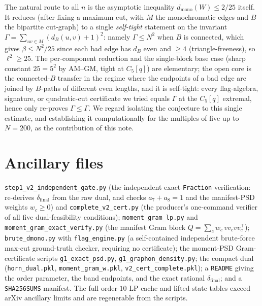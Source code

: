 \documentclass[11pt]{article}
\theoremstyle{remark}
\newcommand{\bip}{\beta}
\newcommand{\dmono}{d_{\mathrm{mono}}}
\begin{document}
The natural route to all $n$ is the asymptotic inequality $\dmono(W)\le 2/25$
itself. It reduces (after fixing a maximum cut, with $M$ the monochromatic edges
and $B$ the bipartite cut-graph) to a single \emph{self-tight} statement on the
invariant $\Gamma=\sum_{uv\in M}(d_B(u,v)+1)^2$: namely $\Gamma\le N^2$ when $B$ is
connected, which gives $\bip\le N^2/25$ since each bad edge has $d_B$ even and
$\ge 4$ (triangle-freeness), so $\ell^2\ge 25$. The per-component reduction and the
single-block base case (sharp constant $25=5^2$ by AM--GM, tight at $C_5[q]$) are
elementary; the open core is the connected-$B$ transfer in the regime where the
endpoints of a bad edge are joined by $B$-paths of different even lengths, and it is
self-tight: every flag-algebra, signature, or quadratic-cut certificate we tried
equals $\Gamma$ at the $C_5[q]$ extremal, hence only re-proves $\Gamma\le\Gamma$.
We regard isolating the conjecture to this single estimate, and establishing it
computationally for the multiples of five up to $N=200$, as the contribution of this
note.

\section*{Ancillary files}

\texttt{step1\_v2\_independent\_gate.py} (the independent exact-\texttt{Fraction}
verification: re-derives $\delta_{\mathrm{final}}$ from the raw dual, and checks
$a_7+a_8=1$ and the manifest-PSD weights $w_c\ge0$) and \texttt{complete\_v2\_cert.py}
(the producer's one-command verifier of all five dual-feasibility conditions);
\texttt{moment\_gram\_lp.py} and \texttt{moment\_gram\_exact\_verify.py} (the manifest
Gram block $Q=\sum_c w_c\,vv_c vv_c^\top$); \texttt{brute\_dmono.py} with
\texttt{flag\_engine.py} (a self-contained independent brute-force max-cut
ground-truth checker, requiring no certificate); the moment-PSD Gram-certificate
scripts \texttt{g1\_exact\_psd.py}, \texttt{g1\_graphon\_density.py}; the compact dual
(\texttt{horn\_dual.pkl}, \texttt{moment\_gram\_w.pkl}, \texttt{v2\_cert\_complete.pkl});
a \texttt{README} giving the order parameter, the band endpoints, and the exact
rational $\delta_{\mathrm{final}}$; and a \texttt{SHA256SUMS} manifest. The full
order-$10$ LP cache and lifted-state tables exceed arXiv ancillary limits and are
regenerable from the scripts.
\end{document}
